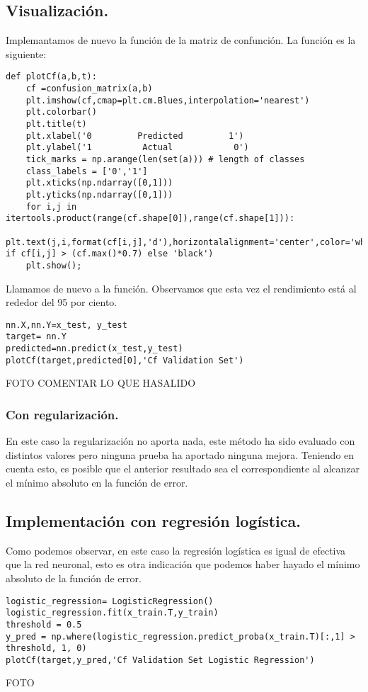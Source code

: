 \documentclass[a4paper,10pt]{article}
\begin{document}
\subsection{Visualización.}
Implemantamos de nuevo la función de la matriz de confunción. La función es la siguiente:
\begin{lstlisting}
def plotCf(a,b,t):
    cf =confusion_matrix(a,b)
    plt.imshow(cf,cmap=plt.cm.Blues,interpolation='nearest')
    plt.colorbar()
    plt.title(t)
    plt.xlabel('0         Predicted         1')
    plt.ylabel('1          Actual            0')
    tick_marks = np.arange(len(set(a))) # length of classes
    class_labels = ['0','1']
    plt.xticks(np.ndarray([0,1]))
    plt.yticks(np.ndarray([0,1]))
    for i,j in itertools.product(range(cf.shape[0]),range(cf.shape[1])):
        plt.text(j,i,format(cf[i,j],'d'),horizontalalignment='center',color='white' if cf[i,j] > (cf.max()*0.7) else 'black')
    plt.show();
\end{lstlisting}
Llamamos de nuevo a la función. Observamos que esta vez el rendimiento está al rededor del 95 por ciento.
\begin{lstlisting}
nn.X,nn.Y=x_test, y_test 
target= nn.Y
predicted=nn.predict(x_test,y_test) 
plotCf(target,predicted[0],'Cf Validation Set')
\end{lstlisting}
FOTO
COMENTAR LO QUE HASALIDO
\subsubsection{Con regularización.}
En este caso la regularización no aporta nada, este método ha sido evaluado con distintos valores pero ninguna prueba ha aportado ninguna mejora. Teniendo en cuenta esto, es posible que el anterior resultado sea el correspondiente al alcanzar el mínimo absoluto en la función de error.

\subsection{Implementación con regresión logística.}
Como podemos observar, en este caso la regresión logística es igual de efectiva que la red neuronal, esto es otra indicación que podemos haber hayado el mínimo absoluto de la función de error.
\begin{lstlisting}
logistic_regression= LogisticRegression()
logistic_regression.fit(x_train.T,y_train)
threshold = 0.5
y_pred = np.where(logistic_regression.predict_proba(x_train.T)[:,1] > threshold, 1, 0)
plotCf(target,y_pred,'Cf Validation Set Logistic Regression')
\end{lstlisting}
FOTO
\end{document}
